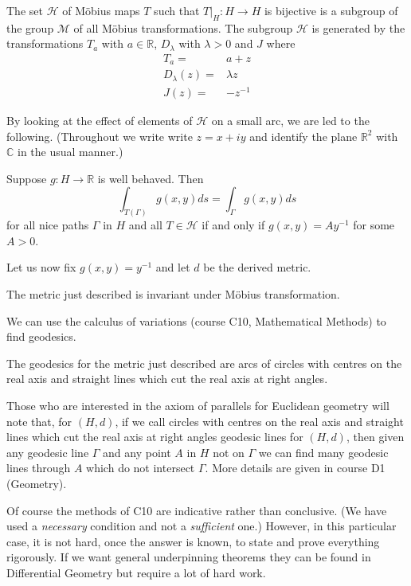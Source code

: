 \begin{statement} The set $\mathcal{H}$
of M\"{o}bius maps $T$ such that $T|_{H}:H\rightarrow H$
is bijective
is a subgroup of the group $\mathcal{M}$
of all M\"{o}bius transformations.
The subgroup $\mathcal{H}$ is generated by
the transformations $T_{a}$ with $a\in{\mathbb R}$,
$D_{\lambda}$ with $\lambda>0$ and $J$ where
\begin{align*}
T_{a}=&a+z\\
D_{\lambda}(z)=&\lambda z\\
J(z)=&-z^{-1}
\end{align*}
\end{statement}
By looking at the effect of elements of $\mathcal{H}$
on a small arc, we are led to the following.
(Throughout we write write $z=x+iy$ and identify
the plane ${\mathbb R}^{2}$ with ${\mathbb C}$ in
the usual manner.)
\begin{statement} Suppose $g:H\rightarrow {\mathbb R}$ is well 
behaved. Then
\[\int_{T(\Gamma)}g(x,y)ds=\int_{\Gamma}g(x,y)ds\]
for all nice paths $\Gamma$ in $H$ and all $T\in{\mathcal H}$
if and only if $g(x,y)=Ay^{-1}$ for some  $A>0$.
\end{statement}

Let us now fix $g(x,y)=y^{-1}$  and let $d$ be the
derived metric. 
\begin{statement} The metric just
described is invariant under M\"{o}bius transformation.
\end{statement}
We can use the calculus of
variations (course C10, Mathematical Methods) to find geodesics.
\begin{statement} The geodesics for the metric just
described are arcs of circles with centres
on the real axis and straight lines
which cut the real axis at right angles.
\end{statement}
Those who are interested in the axiom of parallels
for Euclidean geometry will note that, for $(H,d)$,
if we call circles with centres
on the real axis and straight lines
which cut the real axis at right angles
geodesic lines for $(H,d)$,  then given
any geodesic line $\Gamma$ and any point $A$ in $H$
not on $\Gamma$ we can find many  geodesic
lines through $A$ which do not intersect $\Gamma$.
More details are given in course  D1 (Geometry).

Of course the methods of C10 are indicative rather
than conclusive. (We have used a \emph{necessary}
condition and not a \emph{sufficient} one.)
However, in this particular case, it is not hard,
once the answer is known, to state and prove everything
rigorously. If we want general underpinning theorems
they can be found in Differential Geometry
but require a lot of hard work.

